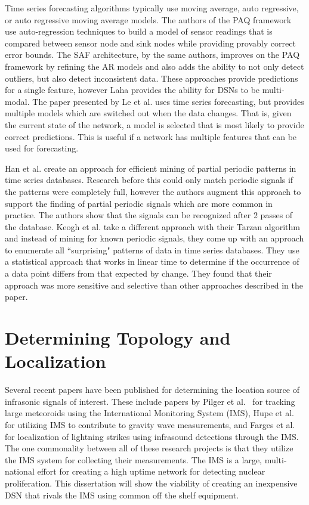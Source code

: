 Time series forecasting algorithms typically use moving average, auto regressive, or auto regressive moving average models. The authors of the PAQ framework\cite{tulone2006paq} use auto-regression techniques to build a model of sensor readings that is compared between sensor node and sink nodes while  providing provably correct error bounds. The SAF architecture\cite{tulone2006energy}, by the same authors, improves on the PAQ framework by refining the AR models and also adds the ability to not only detect outliers, but also detect inconsistent data. These approaches provide predictions for a single feature, however Laha provides the ability for DSNs to be multi-modal. The paper presented by Le et al.\cite{le2007adaptive} uses time series forecasting, but provides multiple models which are switched out when the data changes. That is, given the current state of the network, a model is selected that is most likely to provide correct predictions. This is useful if a network has multiple features that can be used for forecasting.

Han et al.\cite{han1999efficient} create an approach for efficient mining of partial periodic patterns in time series databases. Research before this could only match periodic signals if the patterns were completely full, however the authors augment this approach to support the finding of partial periodic signals which are more common in practice. The authors show that the signals can be recognized after 2 passes of the database. Keogh et al.\cite{keogh2002finding} take a different approach with their Tarzan algorithm and instead of mining for known periodic signals, they come up with an approach to enumerate all ``surprising" patterns of data in time series databases. They use a statistical approach that works in linear time to determine if the occurrence of a data point differs from that expected by change. They found that their approach was more sensitive and selective than other approaches described in the paper.

\section{Determining Topology and Localization}\label{sec:determining-topology-and-localization}

Several recent papers have been published for determining the location source of infrasonic signals of interest. These include papers by Pilger et al.~\cite{pilger2019large} for tracking large meteoroids using the International Monitoring System (IMS), Hupe et al.~\cite{hupe2019can} for utilizing IMS to contribute to gravity wave measurements, and Farges et al.~\cite{farges2019infrasound} for localization of lightning strikes using infrasound detections through the IMS. The one commonality between all of these research projects is that they utilize the IMS system for collecting their measurements. The IMS is a large, multi-national effort for creating a high uptime network for detecting nuclear proliferation. This dissertation will show the viability of creating an inexpensive DSN that rivals the IMS using common off the shelf equipment.

